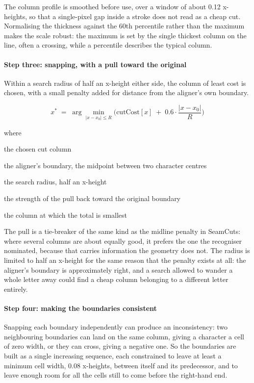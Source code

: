 The column profile is smoothed before use, over a window of about 0.12 x-heights, so that a single-pixel gap inside a stroke does not read as a cheap cut. Normalising the thickness against the 60th percentile rather than the maximum makes the scale robust: the maximum is set by the single thickest column on the line, often a crossing, while a percentile describes the typical column.


\paragraph{Step three: snapping, with a pull toward the original}
Within a search radius of half an x-height either side, the column of least cost is chosen, with a small penalty added for distance from the aligner's own boundary.


\begin{equation}
x^{*} \;=\; \arg\min_{|x - x_0| \le R} \Big( \mathrm{cutCost}[x] \;+\; 0.6 \cdot \frac{|x - x_0|}{R} \Big)
\end{equation}

\noindent where
\begin{description}[leftmargin=2.4em,style=nextline,font=\normalfont\ttfamily]\setlength\itemsep{1pt}
  \item[{$x^{*}$}] \normalfont the chosen cut column
  \item[{$x_0$}] \normalfont the aligner's boundary, the midpoint between two character centres
  \item[{$R$}] \normalfont the search radius, half an x-height
  \item[{$0.6$}] \normalfont the strength of the pull back toward the original boundary
  \item[{$\arg\min$}] \normalfont the column at which the total is smallest
\end{description}
The pull is a tie-breaker of the same kind as the midline penalty in SeamCuts: where several columns are about equally good, it prefers the one the recogniser nominated, because that carries information the geometry does not. The radius is limited to half an x-height for the same reason that the penalty exists at all: the aligner's boundary is approximately right, and a search allowed to wander a whole letter away could find a cheap column belonging to a different letter entirely.


\paragraph{Step four: making the boundaries consistent}
Snapping each boundary independently can produce an inconsistency: two neighbouring boundaries can land on the same column, giving a character a cell of zero width, or they can cross, giving a negative one. So the boundaries are built as a single increasing sequence, each constrained to leave at least a minimum cell width, 0.08 x-heights, between itself and its predecessor, and to leave enough room for all the cells still to come before the right-hand end.

